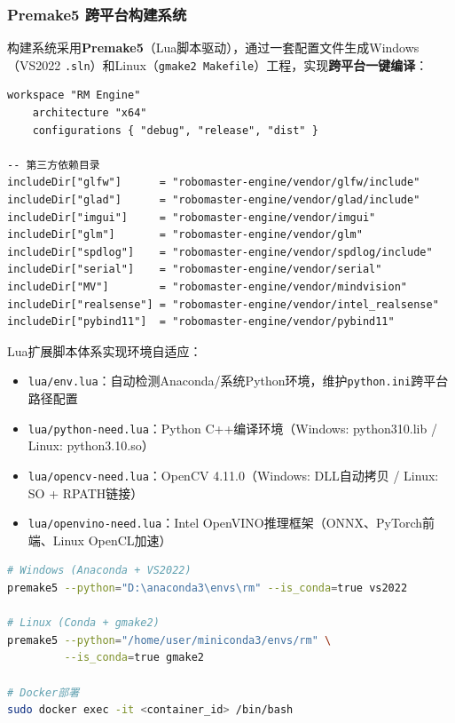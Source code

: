 \documentclass[12pt,a4paper]{ctexart}
\begin{document}
\subsubsection{Premake5 跨平台构建系统}

构建系统采用\textbf{Premake5}（Lua脚本驱动），通过一套配置文件生成Windows（VS2022 \texttt{.sln}）和Linux（\texttt{gmake2 Makefile}）工程，实现\textbf{跨平台一键编译}：

\begin{lstlisting}[style=cppstyle, caption={premake5.lua 核心构建配置}, language={[5.3]Lua}]
workspace "RM Engine"
    architecture "x64"
    configurations { "debug", "release", "dist" }

-- 第三方依赖目录
includeDir["glfw"]      = "robomaster-engine/vendor/glfw/include"
includeDir["glad"]      = "robomaster-engine/vendor/glad/include"
includeDir["imgui"]     = "robomaster-engine/vendor/imgui"
includeDir["glm"]       = "robomaster-engine/vendor/glm"
includeDir["spdlog"]    = "robomaster-engine/vendor/spdlog/include"
includeDir["serial"]    = "robomaster-engine/vendor/serial"
includeDir["MV"]        = "robomaster-engine/vendor/mindvision"
includeDir["realsense"] = "robomaster-engine/vendor/intel_realsense"
includeDir["pybind11"]  = "robomaster-engine/vendor/pybind11"
\end{lstlisting}

Lua扩展脚本体系实现环境自适应：
\begin{itemize}
    \item \texttt{lua/env.lua}：自动检测Anaconda/系统Python环境，维护\texttt{python.ini}跨平台路径配置
    \item \texttt{lua/python-need.lua}：Python C++编译环境（Windows: python310.lib / Linux: python3.10.so）
    \item \texttt{lua/opencv-need.lua}：OpenCV 4.11.0（Windows: DLL自动拷贝 / Linux: SO + RPATH链接）
    \item \texttt{lua/openvino-need.lua}：Intel OpenVINO推理框架（ONNX、PyTorch前端、Linux OpenCL加速）
\end{itemize}

\begin{lstlisting}[style=cppstyle, caption={跨平台构建命令}, language=bash]
# Windows (Anaconda + VS2022)
premake5 --python="D:\anaconda3\envs\rm" --is_conda=true vs2022

# Linux (Conda + gmake2)
premake5 --python="/home/user/miniconda3/envs/rm" \
         --is_conda=true gmake2

# Docker部署
sudo docker exec -it <container_id> /bin/bash
\end{lstlisting}
\end{document}
